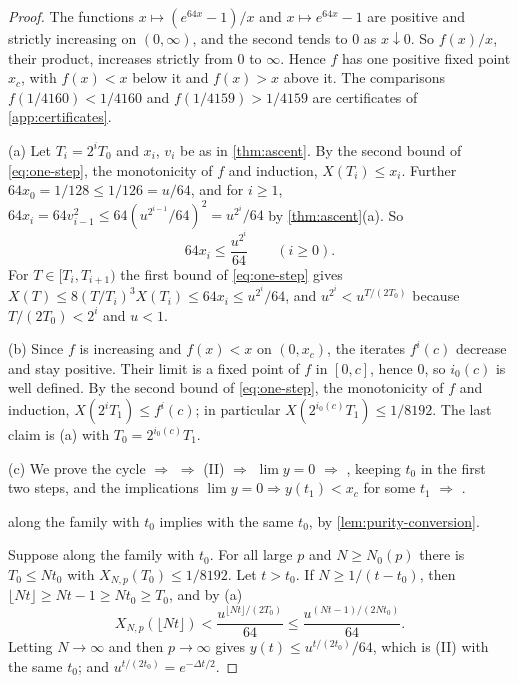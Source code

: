 \documentclass[11pt,a4paper]{amsart}
\theoremstyle{definition}
\theoremstyle{remark}
\numberwithin{equation}{section}
\newcommand{\xconst}{\frac{1}{8192}}       %
\newcommand{\xconstinl}{1/8192}            %
\newcommand{\Mcirc}{\text{\upshape(M$^{\circ}$)}}   %
\newcommand{\Bcirc}{\text{\upshape(B$^{\circ}$)}}   %
\newcommand{\tzero}{t_0}                   %
\begin{document}
\begin{proof}
The functions $x\mapsto(e^{64x}-1)/x$ and $x\mapsto e^{64x}-1$ are positive and strictly increasing on $(0,\infty)$, and the second tends to $0$ as $x\downarrow0$. So $f(x)/x$, their product, increases strictly from $0$ to $\infty$. Hence $f$ has one positive fixed point $x_c$, with $f(x)<x$ below it and $f(x)>x$ above it. The comparisons $f(1/4160)<1/4160$ and $f(1/4159)>1/4159$ are certificates of \cref{app:certificates}.

(a) Let $T_i=2^iT_0$ and $x_i$, $v_i$ be as in \cref{thm:ascent}. By the second bound of \eqref{eq:one-step}, the monotonicity of $f$ and induction, $X(T_i)\le x_i$. Further $64x_0=1/128\le1/126=u/64$, and for $i\ge1$, $64x_i=64v_{i-1}^2\le64(u^{2^{i-1}}/64)^2=u^{2^i}/64$ by \cref{thm:ascent}(a). So
\begin{equation}\label{eq:envelope}
64x_i\le\frac{u^{2^i}}{64}\qquad(i\ge0).
\end{equation}
For $T\in[T_i,T_{i+1})$ the first bound of \eqref{eq:one-step} gives $X(T)\le8(T/T_i)^3X(T_i)\le64x_i\le u^{2^i}/64$, and $u^{2^i}<u^{T/(2T_0)}$ because $T/(2T_0)<2^i$ and $u<1$.

(b) Since $f$ is increasing and $f(x)<x$ on $(0,x_c)$, the iterates $f^i(c)$ decrease and stay positive. Their limit is a fixed point of $f$ in $[0,c]$, hence $0$, so $i_0(c)$ is well defined. By the second bound of \eqref{eq:one-step}, the monotonicity of $f$ and induction, $X(2^iT_1)\le f^i(c)$; in particular $X(2^{i_0(c)}T_1)\le\xconstinl$. The last claim is (a) with $T_0=2^{i_0(c)}T_1$.

(c) We prove the cycle \Mcirc{} $\Rightarrow$ \Bcirc{} $\Rightarrow$ (II) $\Rightarrow$ $\lim y=0$ $\Rightarrow$ \Mcirc{}, keeping $\tzero$ in the first two steps, and the implications $\lim y=0\Rightarrow y(t_1)<x_c$ for some $t_1$ $\Rightarrow$ \Bcirc{}.

\Mcirc{} along the family with $\tzero$ implies \Bcirc{} with the same $\tzero$, by \cref{lem:purity-conversion}.

Suppose \Bcirc{} along the family with $\tzero$. For all large $p$ and $N\ge N_0(p)$ there is $T_0\le N\tzero$ with $X_{N,p}(T_0)\le\xconstinl$. Let $t>\tzero$. If $N\ge1/(t-\tzero)$, then $\lfloor Nt\rfloor\ge Nt-1\ge N\tzero\ge T_0$, and by (a)
\[
X_{N,p}(\lfloor Nt\rfloor)<\frac{u^{\lfloor Nt\rfloor/(2T_0)}}{64}\le\frac{u^{(Nt-1)/(2N\tzero)}}{64}.
\]
Letting $N\to\infty$ and then $p\to\infty$ gives $y(t)\le u^{t/(2\tzero)}/64$, which is (II) with the same $\tzero$; and $u^{t/(2t_0)}=e^{-\Delta t/2}$.


\end{proof}
\end{document}
